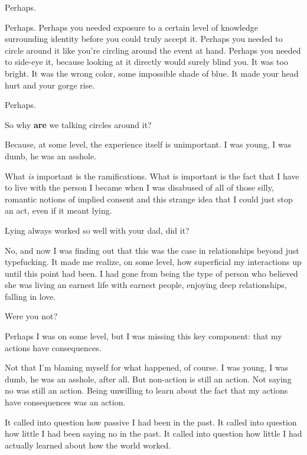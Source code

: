 Perhaps.

\begin{ally}
Perhaps. Perhaps you needed exposure to a certain level of knowledge surrounding identity before you could truly accept it. Perhaps you needed to circle around it like you're circling around the event at hand. Perhaps you needed to side-eye it, because looking at it directly would surely blind you. It was too bright. It was the wrong color, some impossible shade of blue. It made your head hurt and your gorge rise.
\end{ally}
Perhaps.
\newpage

\begin{ally}
So why \textbf{are} we talking circles around it?
\end{ally}
Because, at some level, the experience itself is unimportant. I was young, I was dumb, he was an asshole.

What \emph{is} important is the ramifications. What is important is the fact that I have to live with the person I became when I was disabused of all of those silly, romantic notions of implied consent and this strange idea that I could just stop an act, even if it meant lying.

\begin{ally}
Lying always worked so well with your dad, did it?
\end{ally}
No, and now I was finding out that this was the case in relationships beyond just typefucking. It made me realize, on some level, how superficial my interactions up until this point had been. I had gone from being the type of person who believed she was living an earnest life with earnest people, enjoying deep relationships, falling in love.

\begin{ally}
Were you not?
\end{ally}
Perhaps I was on some level, but I was missing this key component: that my actions have consequences.

Not that I'm blaming myself for what happened, of course. I was young, I was dumb, he was an asshole, after all. But non-action is still an action. Not saying no was still an action. Being unwilling to learn about the fact that my actions have consequences was an action.

It called into question how passive I had been in the past. It called into question how little I had been saying no in the past. It called into question how little I had actually learned about how the world worked.


